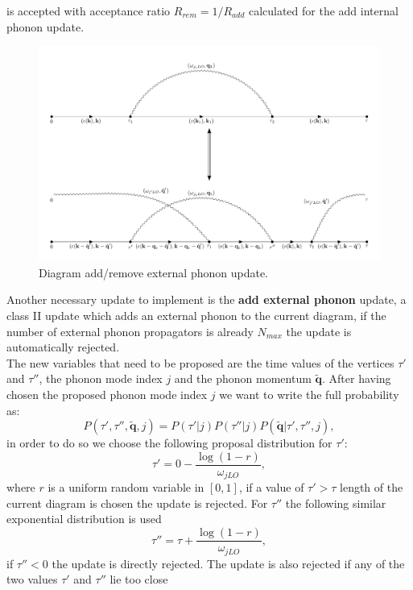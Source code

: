 is accepted with acceptance ratio $R_{rem}=1/R_{add}$ calculated for the add internal phonon update.
\begin{figure}[H]
    \centering
    \includegraphics[scale=0.6]{add_ext_update.pdf}
    \caption{Diagram add/remove external phonon update.}
    \label{fig:diagram_add_ext}
\end{figure}
Another necessary update to implement is the \textbf{add external phonon} update, a class II update which adds an external phonon to 
the current diagram, if the number of external phonon propagators is already $N_{max}$ the update is automatically rejected.\\ 
The new variables that need to be proposed are the time values of the vertices $\tau'$ and $\tau''$, the phonon mode index 
$j$ and the phonon momentum $\tilde{\mathbf{q}}$. After having chosen the proposed phonon mode index $j$ we want to write the full probability as:
\begin{equation}
    P(\tau',\tau'',\tilde{\mathbf{q}},j)=P(\tau'|j)P(\tau''|j)P(\tilde{\mathbf{q}}|\tau',\tau'',j),
\end{equation}
in order to do so we choose the following proposal distribution for $\tau'$:
\begin{equation}
    \tau'=0-\frac{\log{\left(1-r\right)}}{\omega_{jLO}},
\end{equation}
where $r$ is a uniform random variable in $[0,1]$, if a value of $\tau'>\tau$ length of the current diagram is chosen the update is rejected. For 
$\tau''$ the following similar exponential distribution is used
\begin{equation}
    \tau''=\tau+\frac{\log{\left(1-r\right)}}{\omega_{jLO}},
\end{equation}
if $\tau''<0$ the update is directly rejected. The update is also rejected if any of the two values $\tau'$ and $\tau''$ lie too close 
